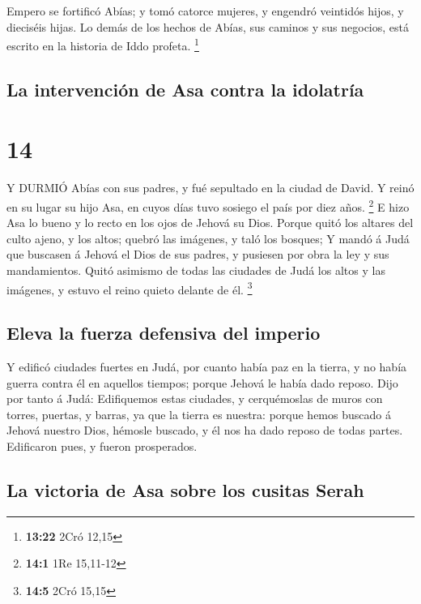  Empero se fortificó Abías; y tomó catorce mujeres, y
engendró veintidós hijos, y dieciséis hijas.  Lo demás de
los hechos de Abías, sus caminos y sus negocios, está escrito en la
historia de Iddo profeta. \footnote{\textbf{13:22} 2Cró 12,15}

\hypertarget{la-intervenciuxf3n-de-asa-contra-la-idolatruxeda}{%
\subsection{La intervención de Asa contra la
idolatría}\label{la-intervenciuxf3n-de-asa-contra-la-idolatruxeda}}

\hypertarget{section-13}{%
\section{14}\label{section-13}}

 Y DURMIÓ Abías con sus padres, y fué sepultado en la ciudad
de David. Y reinó en su lugar su hijo Asa, en cuyos días tuvo sosiego el
país por diez años. \footnote{\textbf{14:1} 1Re 15,11-12}  E
hizo Asa lo bueno y lo recto en los ojos de Jehová su Dios. 
Porque quitó los altares del culto ajeno, y los altos; quebró las
imágenes, y taló los bosques;  Y mandó á Judá que buscasen á
Jehová el Dios de sus padres, y pusiesen por obra la ley y sus
mandamientos.  Quitó asimismo de todas las ciudades de Judá
los altos y las imágenes, y estuvo el reino quieto delante de él.
\footnote{\textbf{14:5} 2Cró 15,15}

\hypertarget{eleva-la-fuerza-defensiva-del-imperio}{%
\subsection{Eleva la fuerza defensiva del
imperio}\label{eleva-la-fuerza-defensiva-del-imperio}}

 Y edificó ciudades fuertes en Judá, por cuanto había paz en
la tierra, y no había guerra contra él en aquellos tiempos; porque
Jehová le había dado reposo.  Dijo por tanto á Judá:
Edifiquemos estas ciudades, y cerquémoslas de muros con torres, puertas,
y barras, ya que la tierra es nuestra: porque hemos buscado á Jehová
nuestro Dios, hémosle buscado, y él nos ha dado reposo de todas partes.
Edificaron pues, y fueron prosperados.

\hypertarget{la-victoria-de-asa-sobre-los-cusitas-serah}{%
\subsection{La victoria de Asa sobre los cusitas
Serah}\label{la-victoria-de-asa-sobre-los-cusitas-serah}}

